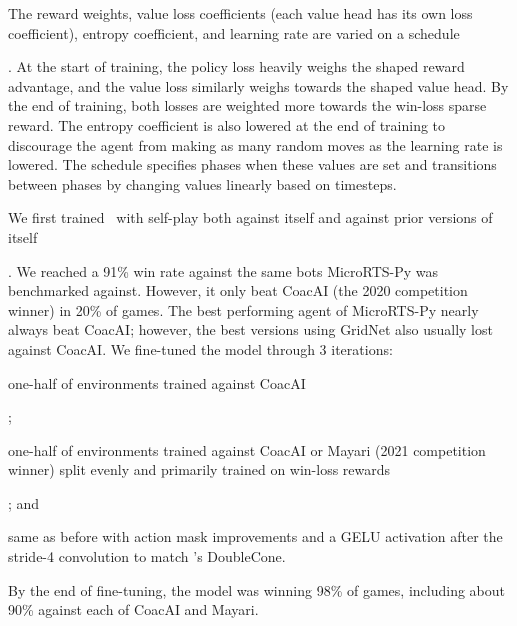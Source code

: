 \documentclass[conference]{IEEEtran}
\newif\ifsupplemental
\newcommand{\supptableref}[1]{%
  \ifsupplemental
    \ (Supplemental Table~\ref{#1})%
  \fi
}
\begin{document}
The reward weights, value loss coefficients (each value
head has its own loss coefficient), entropy coefficient, and learning rate are varied on
a schedule\supptableref{tab:initial-training-schedule}. At the start of training, the policy loss heavily weighs the shaped 
reward advantage, and the value loss similarly weighs towards the shaped value head. By the end
of training, both losses are weighted more towards the win-loss sparse reward. The entropy coefficient is also
lowered at the end of training to discourage the agent from making as many random moves as the
learning rate is lowered. The schedule specifies phases when these values are set and
transitions between phases by changing values linearly based on timesteps.

We first trained \agentName\ with self-play both against itself and against prior
versions of itself\supptableref{tab:training-parameters}. We reached a 91\% win rate against the same bots MicroRTS-Py was
benchmarked against. However, it only beat CoacAI (the 2020 competition winner) in 20\%
of games. The best performing agent of MicroRTS-Py nearly always beat CoacAI; however,
the best versions using GridNet also usually lost against CoacAI. We fine-tuned
the model through 3 iterations:
\begin{inparaenum}[(1)]
    \item one-half of environments trained against CoacAI\supptableref{tab:shaped-finetuning-schedule};
    \item one-half of environments trained against CoacAI or Mayari (2021 competition
    winner) split evenly and primarily trained on win-loss rewards\supptableref{tab:sparse-finetuning-schedule}; and
    \item same as before with action mask improvements and a GELU activation
    after the stride-4 convolution to match \cite{Ferdinand2021doublecone}'s DoubleCone.
\end{inparaenum}
By the end of fine-tuning, the model was winning 98\% of games, including about 90\%
against each of CoacAI and Mayari.
\end{document}
